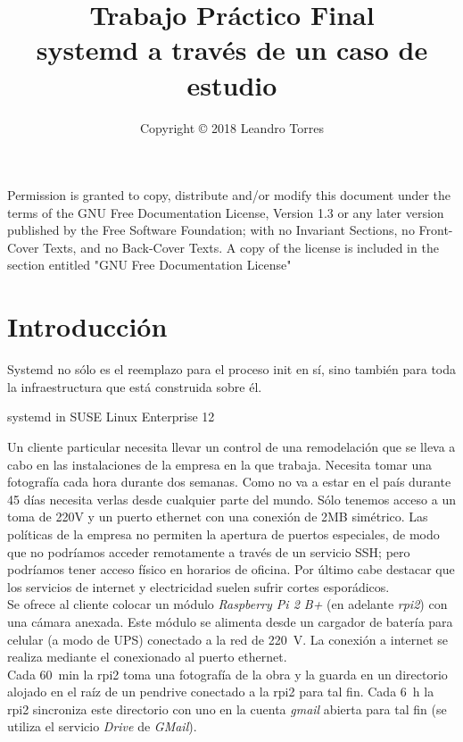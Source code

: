\documentclass[10pt,a4paper]{article}
\author{Copyright © 2018 Leandro Torres}
\title{\Huge{Trabajo Pr\'actico Final}\\
	\vspace{5cm}
	\huge{systemd a trav\'es de un caso de estudio}}
\date{}
\begin{document}
\maketitle
\pagebreak

\begin{center}
Permission is granted to copy, distribute and/or modify this document  under the terms of the GNU Free Documentation License, Version 1.3 or any later version published by the Free Software Foundation;  with no Invariant Sections, no Front-Cover Texts, and no Back-Cover Texts.  A copy of the license is included in the section entitled "GNU Free Documentation License"
\end{center}

\pagebreak

\tableofcontents

\pagebreak

\section{Introducci\'on}

\epigraph{Systemd no s\'olo es el reemplazo para el proceso init en s\'i, sino tambi\'en para toda la infraestructura que est\'a construida sobre \'el.}{systemd in SUSE Linux Enterprise 12}

Un cliente particular necesita llevar un control de una remodelaci\'on que se lleva a cabo en las instalaciones de la empresa en la que trabaja. Necesita tomar una fotograf\'ia cada hora durante dos semanas. Como no va a estar en el pa\'is durante 45 d\'ias necesita verlas desde cualquier parte del mundo. S\'olo tenemos acceso a un toma de 220V y un puerto ethernet con una conexi\'on de 2MB sim\'etrico. Las pol\'iticas de la empresa no permiten la apertura de puertos especiales, de modo que no podr\'iamos acceder remotamente a trav\'es de un servicio SSH; pero podr\'iamos tener acceso f\'isico en horarios de oficina. Por \'ultimo cabe destacar que los servicios de internet y electricidad suelen sufrir cortes espor\'adicos.\\

Se ofrece al cliente colocar un m\'odulo \emph{Raspberry Pi 2 B+} (en adelante \emph{rpi2}) con una c\'amara anexada. Este m\'odulo se alimenta desde un cargador de bater\'ia para celular (a modo de UPS) conectado a la red de \SI{220}{V}. La conexi\'on a internet se realiza mediante el conexionado al puerto ethernet.\\

Cada \SI{60}{min} la rpi2 toma una fotograf\'ia de la obra y la guarda en un directorio alojado en el ra\'iz de un pendrive conectado a la rpi2 para tal fin. Cada \SI{6}{h} la rpi2 sincroniza este directorio con uno en la cuenta \emph{gmail} abierta para tal fin (se utiliza el servicio \emph{Drive} de \emph{GMail}).
\end{document}
